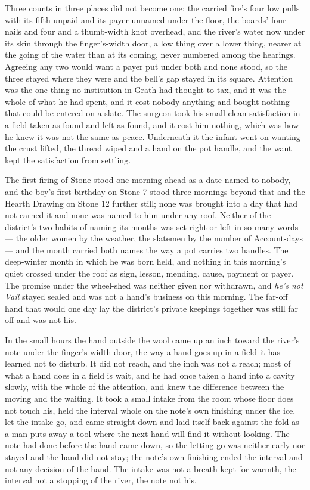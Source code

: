 Three counts in three places did not become one: the carried fire's four low pulls with its fifth unpaid and its payer unnamed under the floor, the boards' four nails and four and a thumb-width knot overhead, and the river's water now under its skin through the finger's-width door, a low thing over a lower thing, nearer at the going of the water than at its coming, never numbered among the hearings. Agreeing any two would want a payer put under both and none stood, so the three stayed where they were and the bell's gap stayed in its square. Attention was the one thing no institution in Grath had thought to tax, and it was the whole of what he had spent, and it cost nobody anything and bought nothing that could be entered on a slate. The surgeon took his small clean satisfaction in a field taken as found and left as found, and it cost him nothing, which was how he knew it was not the same as peace. Underneath it the infant went on wanting the crust lifted, the thread wiped and a hand on the pot handle, and the want kept the satisfaction from settling.

The first firing of Stone stood one morning ahead as a date named to nobody, and the boy's first birthday on Stone 7 stood three mornings beyond that and the Hearth Drawing on Stone 12 further still; none was brought into a day that had not earned it and none was named to him under any roof. Neither of the district's two habits of naming its months was set right or left in so many words --- the older women by the weather, the slatemen by the number of Account-days --- and the month carried both names the way a pot carries two handles. The deep-winter month in which he was born held, and nothing in this morning's quiet crossed under the roof as sign, lesson, mending, cause, payment or payer. The promise under the wheel-shed was neither given nor withdrawn, and \emph{he's not Vail} stayed sealed and was not a hand's business on this morning. The far-off hand that would one day lay the district's private keepings together was still far off and was not his.

In the small hours the hand outside the wool came up an inch toward the river's note under the finger's-width door, the way a hand goes up in a field it has learned not to disturb. It did not reach, and the inch was not a reach; most of what a hand does in a field is wait, and he had once taken a hand into a cavity slowly, with the whole of the attention, and knew the difference between the moving and the waiting. It took a small intake from the room whose floor does not touch his, held the interval whole on the note's own finishing under the ice, let the intake go, and came straight down and laid itself back against the fold as a man puts away a tool where the next hand will find it without looking. The note had done before the hand came down, so the letting-go was neither early nor stayed and the hand did not stay; the note's own finishing ended the interval and not any decision of the hand. The intake was not a breath kept for warmth, the interval not a stopping of the river, the note not his.


